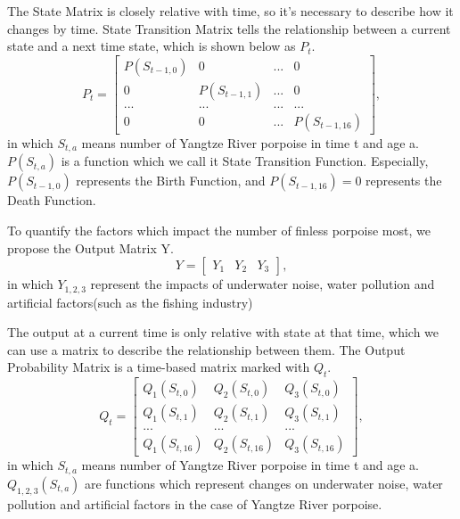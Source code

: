\documentclass[12pt]{article}  %
\begin{document}
\begin{Definition}
The State Matrix is closely relative with time, so it's necessary to describe how it changes by time. State Transition Matrix tells the relationship between a current state and a next time state, which is shown below as $P_t$.
\begin{equation}
P_t = 
\left[
\begin{matrix}
    P(S_{t-1,0}) & 0 & ... & 0 \\
    0 & P(S_{t-1,1}) & ... & 0 \\
    ... & ... & ... & ...\\
    0 & 0 & ... & P(S_{t-1,16})
\end{matrix} \right
] , 
\end{equation}
in which $S_{t,a}$ means number of Yangtze River porpoise in time t and age a. $P(S_{t,a})$ is a function which we call it State Transition Function. Especially, $P(S_{t-1,0})$ represents the Birth  Function, and $P(S_{t-1,16}) = 0$  represents the Death Function.
\end{Definition}

\begin{Definition}
To quantify the factors which impact the number of finless porpoise most, we propose the Output Matrix Y.
\begin{equation}
Y =
\left[
\begin{matrix}
    Y_1 & Y_2 & Y_3
\end{matrix} \right    
] ,    
\end{equation}
in which $Y_{1,2,3}$ represent the impacts of underwater noise, water pollution and artificial factors(such as the fishing industry)
\end{Definition}

\begin{Definition}
The output at a current time is only relative with state at that time, which we can use a matrix to describe the relationship between them. The Output Probability Matrix is a time-based matrix marked with $Q_t$.
\begin{equation}
Q_t = 
\left[
\begin{matrix}
    Q_1(S_{t,0}) & Q_2(S_{t,0}) & Q_3(S_{t,0}) \\
    Q_1(S_{t,1}) & Q_2(S_{t,1}) & Q_3(S_{t,1}) \\
    ... & ... & ... \\
    Q_1(S_{t,16}) & Q_2(S_{t,16}) & Q_3(S_{t,16})
\end{matrix} \right
] ,
\end{equation}
in which $S_{t,a}$ means number of Yangtze River porpoise in time t and age a. $Q_{1,2,3}(S_{t,a})$ are functions which represent changes on underwater noise, water pollution and artificial factors in the case of Yangtze River porpoise.
\end{Definition}
\end{document}

